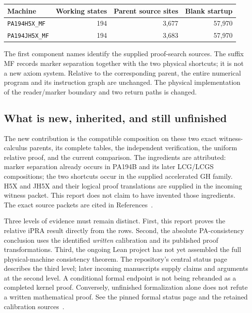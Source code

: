 \documentclass[11pt,letterpaper]{article}
\newcommand{\file}[1]{\texttt{\nolinkurl{#1}}}
\begin{document}
\begin{center}
\begin{tabular}{@{}lrrr@{}}
\toprule
Machine & Working states & Parent source sites & Blank startup\\\midrule
\file{PA194H5X_MF} &194&3,677&57,970\\
\file{PA194JH5X_MF} &194&3,683&57,970\\\bottomrule
\end{tabular}
\end{center}
The first component names identify the supplied proof-search sources.
The suffix MF records marker separation together with the two physical
shortcuts; it is not a new axiom system. Relative to the corresponding
parent, the entire numerical program and its instruction graph are unchanged.
The physical implementation of the reader/marker boundary and two return
paths is changed.



\subsection{What is new, inherited, and still unfinished}
The new contribution is the compatible composition on these two exact
witness-calculus parents, its complete tables, the independent verification,
the uniform relative proof, and the current comparison. The ingredients
are attributed: marker separation already occurs in PA194B and its later
LCG/LCGS compositions; the two shortcuts occur in the supplied accelerated
GH family. H5X and JH5X and their logical proof translations are supplied
in the incoming witness packet. This report does not claim to have invented
those ingredients. The exact source packets are cited in
References~\cite{witness,marker,fast}.

Three levels of evidence must remain distinct. First, this report proves
the relative iPRA result directly from the rows. Second, the absolute
PA-consistency conclusion uses the identified \emph{written} calibration
and its published proof transformations. Third, the ongoing Lean project
has not yet assembled the full physical-machine consistency theorem.
The repository's central status page describes the third level; later
incoming manuscripts supply claims and arguments at the second level.
A conditional formal endpoint is not being rebranded as a completed kernel
proof. Conversely, unfinished formalization alone does not refute a written
mathematical proof. See the pinned formal status page and the retained
calibration sources~\cite{pa,ax11h}.
\end{document}

